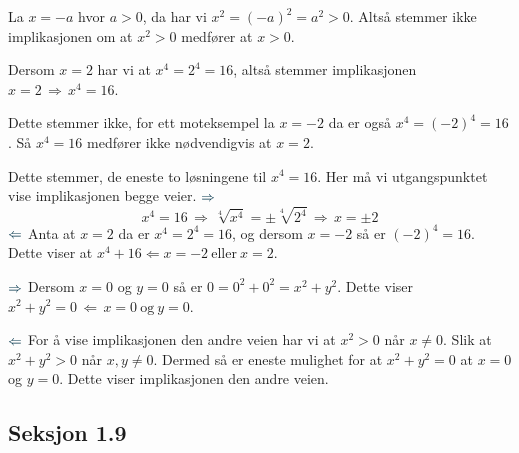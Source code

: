 \documentclass[a4paper,11pt]{article}
\begin{document}
\begin{solution}
   La $x = -a$ hvor $a>0$, da har
  vi $x^2 = (-a)^2 = a^2 > 0$.  Altså stemmer ikke implikasjonen om at $x^2>0$
  medfører at $x>0$.
  \medskip

   Dersom $x=2$ har vi at $x^4
  = 2^4 = 16$, altså stemmer implikasjonen $x=2\,\Rightarrow\,x^4=16$.
  \medskip

   Dette stemmer ikke, for ett
  moteksempel la $x=-2$ da er også $x^4 = (-2)^4 = 16$. Så $x^4 = 16$ medfører
  ikke nødvendigvis at $x=2$. \medskip

   Dette stemmer, de eneste to
  løsningene til $x^4 = 16$. Her må vi utgangspunktet vise implikasjonen begge
  veier. $\textcolor{UiT-main}{\Rightarrow}$ 
  \begin{equation}
    x^4 = 16 \, \Rightarrow \, 
    \sqrt[4]{x^4} = \pm \sqrt[4]{2^4} 
    \, \Rightarrow \, 
    x = \pm 2
  \end{equation}
  $\textcolor{UiT-main}{\Leftarrow}$ Anta at $x = 2$ da er $x^4 = 2^4 = 16$,
  og dersom $x=-2$ så er $(-2)^4 = 16$. Dette viser at $x^4 + 16 \Leftarrow x
  = -2 \ \text{eller} \ x = 2$.  \medskip

  $\textcolor{UiT-main}{\Rightarrow}$ Dersom $x = 0$ og $y = 0$ så er $0 = 0^2
  + 0^2 = x^2 + y^2$.  Dette viser $x^2 + y^2 = 0\,\Leftarrow\, x = 0 \
  \text{og} \ y = 0$. 

  $\textcolor{UiT-main}{\Leftarrow}$ For å vise implikasjonen den andre veien
  har vi at $x^2 > 0$ når $x \neq 0$. Slik at $x^2 + y^2 > 0$ når $x,y \neq
  0$.  Dermed så er eneste mulighet for at $x^2 + y^2 = 0$ at $x = 0$ og $y =
  0$. Dette viser implikasjonen den andre veien.
\end{solution}

\newpageLF

\newpageNotLF


\subsection*{Seksjon 1.9}
\end{document}
